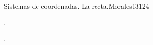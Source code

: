 \begin{syllabus}
\begin{unit}{Sistemas de coordenadas. La recta.}{}{Morales13}{12}{4}
   \begin{topics}
      \item .
   \end{topics}
   \begin{learningoutcomes}
      \item .
   \end{learningoutcomes}
\end{unit}

\begin{coursebibliography}
\end{coursebibliography}

\end{syllabus}

